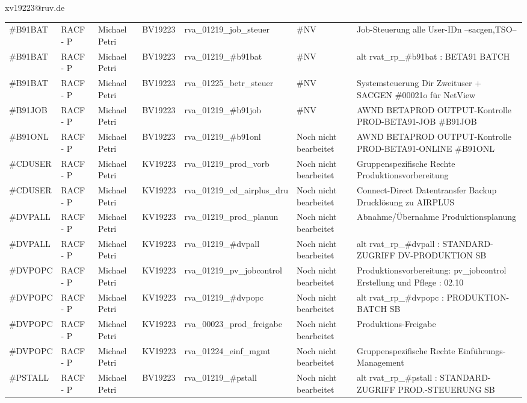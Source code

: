 \documentclass[a4paper,landscape,12pt]{letter}
\begin{document}
\begin{letter}{xv19223@ruv.de\hfill \break}
\begin{tiny}
\begin{longtable}{|p{35mm}|p{15mm}|p{25mm}|p{10mm}|p{40mm}|p{50mm}|p{50mm}|}
\#B91BAT & RACF - P & Michael Petri & BV19223 & rva\_01219\_job\_steuer & \#NV & Job-Steuerung alle User-IDn --sacgen,TSO-- \\
\#B91BAT & RACF - P & Michael Petri & BV19223 & rva\_01219\_\#b91bat & \#NV & alt rvat\_rp\_\#b91bat          : BETA91 BATCH \\
\#B91BAT & RACF - P & Michael Petri & BV19223 & rva\_01225\_betr\_steuer & \#NV & Systemsteuerung Dir Zweituser + SACGEN \#00021o für NetView \\
\#B91JOB & RACF - P & Michael Petri & BV19223 & rva\_01219\_\#b91job & \#NV & AWND BETAPROD OUTPUT-Kontrolle PROD-BETA91-JOB \#B91JOB \\
\#B91ONL & RACF - P & Michael Petri & BV19223 & rva\_01219\_\#b91onl & Noch nicht bearbeitet & AWND BETAPROD OUTPUT-Kontrolle PROD-BETA91-ONLINE \#B91ONL \\
\#CDUSER & RACF - P & Michael Petri & KV19223 & rva\_01219\_prod\_vorb & Noch nicht bearbeitet & Gruppenspezifische Rechte Produktionsvorbereitung \\
\#CDUSER & RACF - P & Michael Petri & KV19223 & rva\_01219\_cd\_airplus\_dru & Noch nicht bearbeitet & Connect-Direct Datentransfer Backup Drucklösung zu AIRPLUS \\
\#DVPALL & RACF - P & Michael Petri & KV19223 & rva\_01219\_prod\_planun & Noch nicht bearbeitet & Abnahme/Übernahme Produktionsplanung \\
\#DVPALL & RACF - P & Michael Petri & KV19223 & rva\_01219\_\#dvpall & Noch nicht bearbeitet & alt rvat\_rp\_\#dvpall          : STANDARD-ZUGRIFF DV-PRODUKTION SB \\
\#DVPOPC & RACF - P & Michael Petri & KV19223 & rva\_01219\_pv\_jobcontrol & Noch nicht bearbeitet & Produktionsvorbereitung: pv\_jobcontrol Erstellung und Pflege : 02.10 \\
\#DVPOPC & RACF - P & Michael Petri & KV19223 & rva\_01219\_\#dvpopc & Noch nicht bearbeitet & alt rvat\_rp\_\#dvpopc          : PRODUKTION-BATCH SB \\
\#DVPOPC & RACF - P & Michael Petri & KV19223 & rva\_00023\_prod\_freigabe & Noch nicht bearbeitet & Produktions-Freigabe \\
\#DVPOPC & RACF - P & Michael Petri & KV19223 & rva\_01224\_einf\_mgmt & Noch nicht bearbeitet & Gruppenspezifische Rechte Einführungs-Management \\
\#PSTALL & RACF - P & Michael Petri & BV19223 & rva\_01219\_\#pstall & Noch nicht bearbeitet & alt rvat\_rp\_\#pstall          : STANDARD-ZUGRIFF PROD.-STEUERUNG SB \\

\end{longtable}
\end{tiny}
\end{letter}
\end{document}
